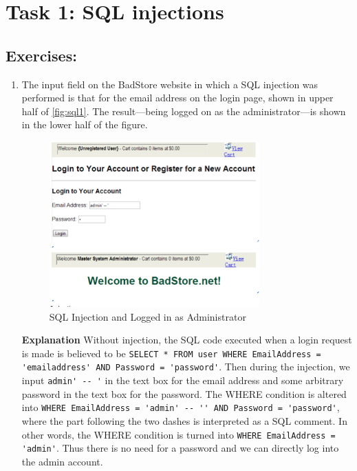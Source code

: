 \section*{Task 1: SQL injections}

\subsection*{Exercises:}
\begin{enumerate}
\item {}

The input field on the BadStore website in which a SQL injection was performed is that for the email address on the login page, shown in upper half of \autoref{fig:sql1}. The result---being logged on as the administrator---is shown in the lower half of the figure.
\begin{figure}[h!]
	\caption{SQL Injection and Logged in as Administrator}
        \label{fig:sql1}
	\centering \includegraphics[height=2.5in]{sqli1}
\end{figure}
  
  \textbf{Explanation} Without injection, the SQL code executed when a login request is made is believed to be \lstinline{SELECT * FROM user WHERE EmailAddress = 'emailaddress' AND Password = 'password'}. Then during the injection, we input \lstinline{admin' -- '} in the text box for the email address and some arbitrary password in the text box for the password. The WHERE condition is altered into \lstinline{WHERE EmailAddress = 'admin' -- '' AND Password = 'password'}, where the part following the two dashes is interpreted as a SQL comment. In other words, the WHERE condition is turned into \lstinline{WHERE EmailAddress = 'admin'}. Thus there is no need for a password and we can directly log into the admin account.


\end{enumerate}
